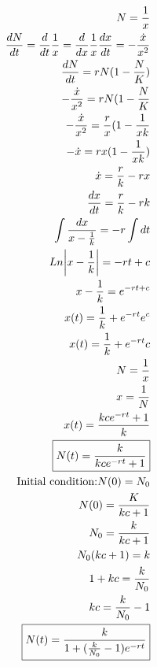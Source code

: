 \documentclass[a4paper,10pt]{article}
\begin{document}
\begin{enumerate}
\begin{enumerate}
            \begin{equation}
                \begin{aligned}
                     N=\frac{1}{x}\\
                     \frac{dN}{dt}=\frac{d}{dt}\frac{1}{x}=\frac{d}{dx}\frac{1}{x}\frac{dx}{dt}=-\frac{\dot{x}}{x^2}\\
                     \frac{dN}{dt}=rN(1-\frac{N}{K})\\
                     -\frac{\dot{x}}{x^2}=rN(1-\frac{N}{K}\\
                     - \frac{\dot{x}}{x^2}=\frac{r}{x}(1-\frac{1}{xk}\\
                     -\dot{x}= rx(1-\frac{1}{xk})\\
                     \dot{x}=\frac{r}{k}-rx\\
                     \frac{dx}{dt}=\frac{r}{k}-rk\\
                     \int\frac{dx}{x- \frac{1}{k}}=-r\int dt\\
                     Ln\abs{x-\frac{1}{k}}=-rt + c\\
                     x-\frac{1}{k}= e^{-rt + c}\\
                     x(t)=\frac{1}{k} + e^{-rt}e^{c}\\
                     x(t)= \frac{1}{k} + e^{-rt}c\\
                     N=\frac{1}{x}\\
                     x=\frac{1}{N}\\
                     x(t)=\frac{kce^{-rt}+1}{k}\\
                     \boxed{N(t)=\frac{k}{kce^{-rt}+1}}\\
                     \text{Initial condition:}
                     N(0)=N_{0}\\
                     N(0)=\frac{K}{kc+1}\\
                     N_{0}=\frac{k}{kc+1}\\
                     N_{0}(kc+1)=k\\
                     1+kc=\frac{k}{N_{0}}\\
                     kc=\frac{k}{N_{0}}-1\\
                     \boxed{N(t)=\frac{k}{1+ (\frac{k}{N_{0}}-1)e^{-rt}}}\\
                \end{aligned}
            \end{equation}
    \end{enumerate}
    \newpage
    

\end{enumerate}
\end{document}
